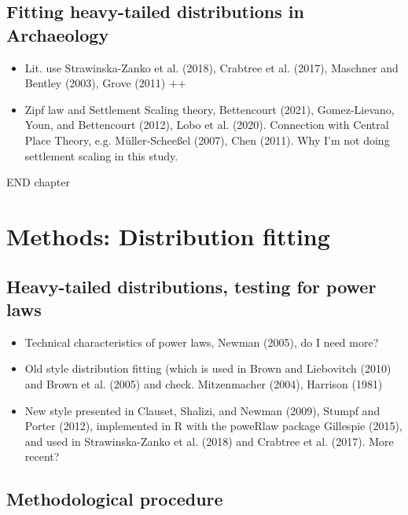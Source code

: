 \documentclass[
  12pt,
]{book}
\begin{document}
\hypertarget{distfit-archaeo}{%
\section{Fitting heavy-tailed distributions in Archaeology}\label{distfit-archaeo}}

\begin{itemize}
\item
  Lit. use Strawinska-Zanko et al. (2018), Crabtree et al. (2017), Maschner and Bentley (2003), Grove (2011) ++
\item
  Zipf law and Settlement Scaling theory, Bettencourt (2021), Gomez-Lievano, Youn, and Bettencourt (2012), Lobo et al. (2020). Connection with Central Place Theory, e.g. Müller-Scheeßel (2007), Chen (2011). Why I'm not doing settlement scaling in this study.
\end{itemize}

END chapter

\hypertarget{methods-distfit}{%
\chapter{Methods: Distribution fitting}\label{methods-distfit}}

\hypertarget{heavy-tailed-distributions-testing-for-power-laws}{%
\section{Heavy-tailed distributions, testing for power laws}\label{heavy-tailed-distributions-testing-for-power-laws}}

\begin{itemize}
\item
  Technical characteristics of power laws, Newman (2005), do I need more?
\item
  Old style distribution fitting (which is used in Brown and Liebovitch (2010) and Brown et al. (2005) and check. Mitzenmacher (2004), Harrison (1981)
\item
  New style presented in Clauset, Shalizi, and Newman (2009), Stumpf and Porter (2012), implemented in R with the poweRlaw package Gillespie (2015), and used in Strawinska-Zanko et al. (2018) and Crabtree et al. (2017). More recent?
\end{itemize}

\hypertarget{methodological-procedure}{%
\section{Methodological procedure}\label{methodological-procedure}}
\end{document}
